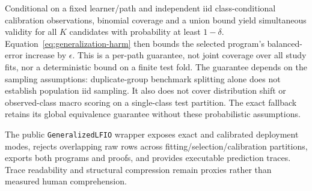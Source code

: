 Conditional on a fixed learner/path and independent iid class-conditional calibration observations, binomial coverage and a union bound yield simultaneous validity for all $K$ candidates with probability at least $1-\delta$. Equation~\ref{eq:generalization-harm} then bounds the selected program's balanced-error increase by $\epsilon$. This is a per-path guarantee, not joint coverage over all study fits, nor a deterministic bound on a finite test fold. The guarantee depends on the sampling assumptions: duplicate-group benchmark splitting alone does not establish population iid sampling. It also does not cover distribution shift or observed-class macro scoring on a single-class test partition. The exact fallback retains its global equivalence guarantee without these probabilistic assumptions.

The public \texttt{GeneralizedLFIO} wrapper exposes exact and calibrated deployment modes, rejects overlapping raw rows across fitting/selection/calibration partitions, exports both programs and proofs, and provides executable prediction traces. Trace readability and structural compression remain proxies rather than measured human comprehension.
